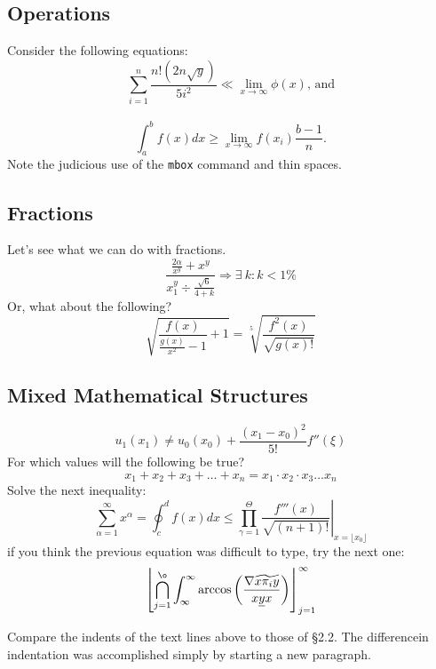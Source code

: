 \documentclass[10pt, a4paper]{article}
\begin{document}
\subsection{Operations}
Consider the following equations:
\[\sum^{n}_{i=1}\frac{n!(2n\sqrt{y})}{5i^2}\ll\displaystyle\lim_{x\rightarrow{\infty}}\phi(x)\mbox{, and}\]\\
\[\int^{b}_{a}f(x)dx\geq\displaystyle\lim_{x\rightarrow\infty}f(x_i)\frac{b-1}{n}.\]
Note the judicious use of the \texttt{mbox} command and thin spaces.

\subsection{Fractions}
Let’s see what we can do with fractions.
\[\frac{\frac{2\alpha}{x^y}+x^y}{x^{y}_{1}\div\frac{\sqrt{6}}{4+k}}\!\Rightarrow\!\exists\:k:k<1\%\]
Or, what about the following?
\[\sqrt{\frac{f(x)}{\frac{g(x)}{x^2}-1}+1}=\sqrt[5]{\frac{f^2(x)}{\sqrt{g(x)!}}}\]
\subsection{Mixed Mathematical Structures}
\[u_1(x_1)\neq u_0(x_0)+\frac{(x_1-x_0)^2}{5!}f''(\xi)\]
For which values will the following be true?
\[x_1+x_2+x_3+\ldots+x_n=x_1\cdot x_2\cdot x_3\ldots x_n\]
Solve the next inequality:
\[\sum^{\infty}_{\alpha=1}x^{\alpha}=\left.\oint^{d}_{c}f(x)dx\leq\prod_{\gamma=1}^\Theta\frac{f'''(x)}{\sqrt{(n+1)!}} \right|_{x=\lfloor x_0\rfloor}\]
if you think the previous equation was difficult to type, try the next one:
\[\left\lfloor\bigcap^{\o}_{j=1}\int^{\infty}_{\infty}\arccos\left(\frac{\nabla\widetilde{x\pi_{i}y}}{x\underline{y}x}\right)\right\rfloor^{\infty}_{j=1}\]\par
Compare the indents of the text lines above to those of \S2.2. The difference\linebreak in indentation was accomplished simply by starting a new paragraph.
\end{document}
